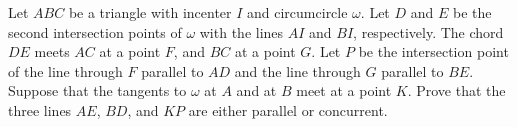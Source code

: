 Let $ABC$ be a triangle with incenter $I$ and circumcircle $\omega$. Let $D$ and $E$ be the second intersection points of $\omega$ with the lines $AI$ and $BI$, respectively. The chord $DE$ meets $AC$ at a point $F$, and $BC$ at a point $G$. Let $P$ be the intersection point of the line through $F$ parallel to $AD$ and the line through $G$ parallel to $BE$. Suppose that the tangents to $\omega$ at $A$ and at $B$ meet at a point $K$. Prove that the three lines $AE$, $BD$, and $KP$ are either parallel or concurrent.
